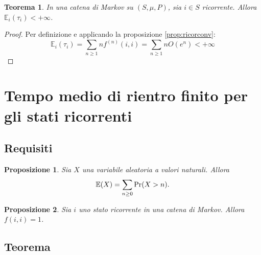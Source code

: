 \documentclass{article}
\theoremstyle{plain}
\newtheorem{thm}{Teorema}
\newtheorem{prop}{Proposizione}
\newcommand{\ev}{\mathbb E}
\newcommand{\ape}[1]{^{(#1)}}
\renewcommand{\Pr}{\mathrm{Pr}}
\begin{document}
\begin{thm}
	In una catena di Markov su $(S,\mu,P)$, sia $i\in S$ ricorrente. Allora $\ev_i(\tau_i)<+\infty$.
\end{thm}
\begin{proof}
	Per definizione e applicando la proposizione \ref{prop:ricorconv}:
	\begin{equation*}
		\ev_i(\tau_i) = \sum_{n\ge1} nf\ape{n}(i,i) = \sum_{n\ge1} nO(e^n) < +\infty
	\end{equation*}
\end{proof}




\section{Tempo medio di rientro finito per gli stati ricorrenti}


\subsection{Requisiti}
\begin{prop}\label{prop:evrandvar}
	Sia $X$ una variabile aleatoria a valori naturali. Allora
	\begin{equation*}
		\ev(X) = \sum_{n\ge0} \Pr(X>n) \text.
	\end{equation*}
\end{prop}

\begin{prop}\label{prop:ricorfii}
	Sia $i$ uno stato ricorrente in una catena di Markov. Allora $f(i,i)=1$.
\end{prop}


\subsection{Teorema}
\end{document}
